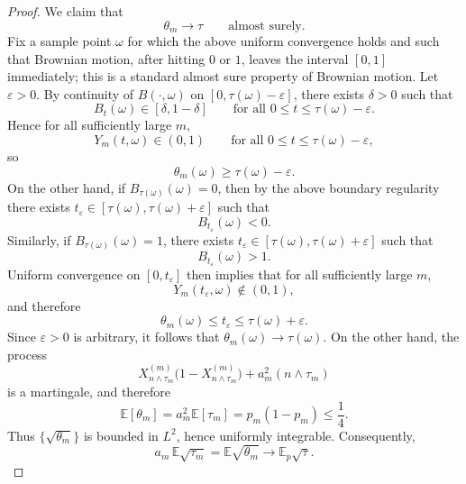 \documentclass[11pt]{amsart}
\theoremstyle{definition}
\renewcommand{\1}{{\mathbbm{1}}}
\begin{document}
\begin{proof}
We claim that
\[
\theta_m\to\tau
\qquad\text{almost surely.}
\]
Fix a sample point $\omega$ for which the above uniform convergence holds and such that Brownian motion, after hitting $0$ or $1$, leaves the interval $[0,1]$ immediately; this is a standard almost sure property of Brownian motion. Let $\varepsilon>0$. By continuity of $B(\cdot,\omega)$ on $[0,\tau(\omega)-\varepsilon]$, there exists $\delta>0$ such that
\[
B_t(\omega)\in[\delta,1-\delta]
\qquad\text{for all }0\le t\le \tau(\omega)-\varepsilon.
\]
Hence for all sufficiently large $m$,
\[
Y_m(t,\omega)\in(0,1)
\qquad\text{for all }0\le t\le \tau(\omega)-\varepsilon,
\]
so
\[
\theta_m(\omega)\ge \tau(\omega)-\varepsilon.
\]
On the other hand, if $B_{\tau(\omega)}(\omega)=0$, then by the above boundary regularity there exists
$t_\varepsilon\in[\tau(\omega),\tau(\omega)+\varepsilon]$ such that
\[
B_{t_\varepsilon}(\omega)<0.
\]
Similarly, if $B_{\tau(\omega)}(\omega)=1$, there exists
$t_\varepsilon\in[\tau(\omega),\tau(\omega)+\varepsilon]$ such that
\[
B_{t_\varepsilon}(\omega)>1.
\]
Uniform convergence on $[0,t_\varepsilon]$ then implies that for all sufficiently large $m$,
\[
Y_m(t_\varepsilon,\omega)\notin(0,1),
\]
and therefore
\[
\theta_m(\omega)\le t_\varepsilon\le \tau(\omega)+\varepsilon.
\]
Since $\varepsilon>0$ is arbitrary, it follows that $\theta_m(\omega)\to\tau(\omega)$.
On the other hand, the process
\[
X_{n\wedge\tau_m}^{(m)}\bigl(1-X_{n\wedge\tau_m}^{(m)}\bigr)+a_m^2(n\wedge\tau_m)
\]
is a martingale, and therefore
\[
\mathbb E[\theta_m]=a_m^2\mathbb E[\tau_m]=p_m(1-p_m)\le \frac14.
\]
Thus $\{\sqrt{\theta_m}\}$ is bounded in $L^2$, hence uniformly integrable. Consequently,
\[
a_m\,\mathbb E\sqrt{\tau_m}
=
\mathbb E\sqrt{\theta_m}
\to
\mathbb E_p\sqrt{\tau}.
\]
\end{proof}
\end{document}
